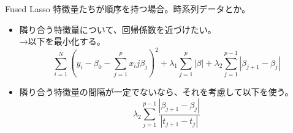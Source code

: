 \documentclass[dvipdfmx,8pt]{beamer}
\begin{document}
  \begin{frame}{Fused Lasso}
    特徴量たちが順序を持つ場合。時系列データとか。
    \begin{itemize}
      \item 隣り合う特徴量について、回帰係数を近づけたい。\\
        →以下を最小化する。
        \[
          \sum_{i=1}^N(y_i-\beta_0-\sum_{j=1}^px_ij\beta_j)^2+\lambda_1\sum_{j=1}^p|\beta|+\lambda_2\sum_{j=1}^{p-1}|\beta_{j+1}-\beta_j|
        \]
      \item 隣り合う特徴量の間隔が一定でないなら、それを考慮して以下を使う。
        \[
          \lambda_2\sum_{j=1}^{p-1}\frac{|\beta_{j+1}-\beta_j|}{|t_{j+1}-t_j|}
        \]
    \end{itemize}
  \end{frame}
  

\end{document}
